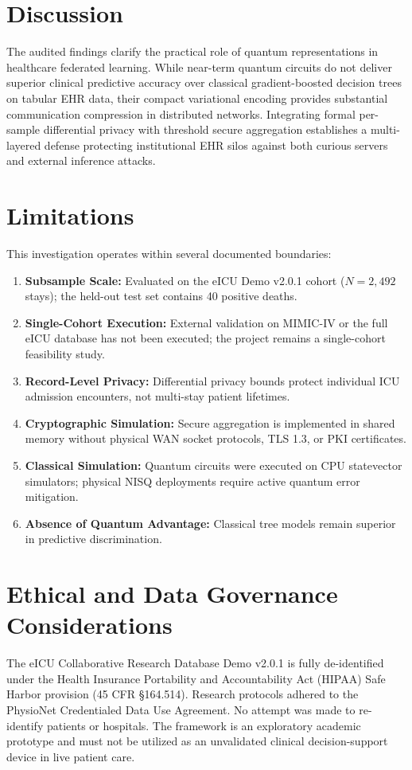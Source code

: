 \documentclass[conference]{IEEEtran}
\begin{document}


\section{Discussion}
The audited findings clarify the practical role of quantum representations in healthcare federated learning. While near-term quantum circuits do not deliver superior clinical predictive accuracy over classical gradient-boosted decision trees on tabular EHR data, their compact variational encoding provides substantial communication compression in distributed networks. Integrating formal per-sample differential privacy with threshold secure aggregation establishes a multi-layered defense protecting institutional EHR silos against both curious servers and external inference attacks.

\section{Limitations}
This investigation operates within several documented boundaries:
\begin{enumerate}
    \item \textbf{Subsample Scale:} Evaluated on the eICU Demo v2.0.1 cohort ($N = 2,492$ stays); the held-out test set contains 40 positive deaths.
    \item \textbf{Single-Cohort Execution:} External validation on MIMIC-IV or the full eICU database has not been executed; the project remains a single-cohort feasibility study.
    \item \textbf{Record-Level Privacy:} Differential privacy bounds protect individual ICU admission encounters, not multi-stay patient lifetimes.
    \item \textbf{Cryptographic Simulation:} Secure aggregation is implemented in shared memory without physical WAN socket protocols, TLS 1.3, or PKI certificates.
    \item \textbf{Classical Simulation:} Quantum circuits were executed on CPU statevector simulators; physical NISQ deployments require active quantum error mitigation.
    \item \textbf{Absence of Quantum Advantage:} Classical tree models remain superior in predictive discrimination.
\end{enumerate}

\section{Ethical and Data Governance Considerations}
The eICU Collaborative Research Database Demo v2.0.1 is fully de-identified under the Health Insurance Portability and Accountability Act (HIPAA) Safe Harbor provision (45 CFR \S 164.514). Research protocols adhered to the PhysioNet Credentialed Data Use Agreement. No attempt was made to re-identify patients or hospitals. The framework is an exploratory academic prototype and must not be utilized as an unvalidated clinical decision-support device in live patient care.
\end{document}
